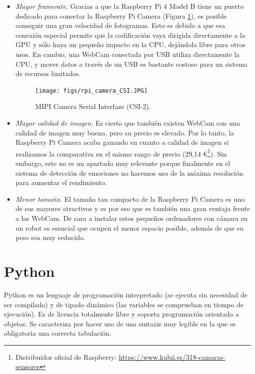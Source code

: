 \begin{itemize}
    \item \textit{Mayor framerate.} Gracias a que la Raspberry Pi 4 Model B tiene un puerto dedicado para conectar la Raspberry Pi Camera (Figura \ref{fig:rpi_camera_CSI}), es posible conseguir una gran velocidad de fotogramas. Esto es debido a que esa conexión especial permite que la codificación vaya dirigida directamente a la GPU y sólo haya un pequeño impacto en la CPU, dejándola libre para otros usos. En cambio, una WebCam conectada por USB utiliza directamente la CPU, y mover datos a través de un USB es bastante costoso para un sistema de recursos limitados.
    
    \begin{figure} [h!]
      \begin{center}
        \texttt{[image: figs/rpi\_camera\_CSI.JPG]}
      \end{center}
      \caption{MIPI Camera Serial Interfaze (CSI-2).}
      \label{fig:rpi_camera_CSI}
    \end{figure}
    
    \item \textit{Mayor calidad de imagen.} Es cierto que también existen WebCam con una calidad de imagen muy buena, pero su precio es elevado. Por lo tanto, la Raspberry Pi Camera acaba ganando en cuanto a calidad de imagen si realizamos la comparativa en el mismo rango de precio (29,14 \euro\footnote{Distribuidor oficial de Raspberry: \url{https://www.kubii.es/318-camaras-sensores}}). Sin embargo, este no es un apartado muy relevante porque finalmente en el sistema de detección de emociones no hacemos uso de la máxima resolución para aumentar el rendimiento.
    
    \item \textit{Menor tamaño.} El tamaño tan compacto de la Raspberry Pi Camera es uno de sus mayores atractivos y es por eso que es también una gran ventaja frente a las WebCam. De cara a instalar estos pequeños ordenadores con cámara en un robot es esencial que ocupen el menor espacio posible, además de que su peso sea muy reducido.
\end{itemize}

\section{Python}

Python es un lenguaje de programación interpretado (se ejecuta sin necesidad de ser compilado) y de tipado dinámico (las variables se comprueban en tiempo de ejecución). Es de licencia totalmente libre y soporta programación orientada a objetos. Se caracteriza por hacer uso de una sintaxis muy legible en la que es obligatoria una correcta tabulación. 

